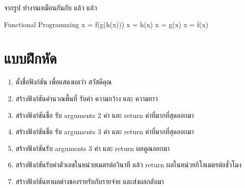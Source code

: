 จากรูป   ทำงานเหมือนกันกับ  แล้ว   แล้ว  

\begin{codelist}{Functional Programming}{}
x = f(g(h(x)))
x = h(x)
x = g(x)
x = f(x)
\end{codelist}


\section{แบบฝึกหัด}

\begin{enumerate} 

\item ตั้งชื่อฟังก์ชัน  เพื่อแสดงผลว่า สวัสดีคุณ
\item สร้างฟังก์ชันคำนวณพื้นที่ รับค่า ความกว้าง และ ความยาว
\item สร้างฟังก์ชันชื่อ   รับ arguments 2 ค่า และ return ค่าที่มากที่สุดออกมา
\item สร้างฟังก์ชันชื่อ   รับ arguments 3 ค่า และ return ค่าที่มากที่สุดออกมา
\item สร้างฟังก์ชันรับ arguments 3 ค่า และ return ผลคูณออกมา
\item สร้างฟังก์ชันรับค่าตัวเลขในหน่วยเมตรต่อวินาที แล้ว return ผลในหน่วยกิโลเมตรต่อชั่วโมง
\item สร้างฟังก์ชันหาผลต่างของรายรับกับรายจ่าย และส่งผลกลับมา

\end{enumerate}


